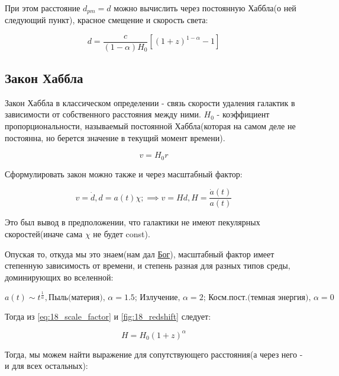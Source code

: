 При этом расстояние $d_{pm} = d$ можно вычислить через постоянную Хаббла(о ней следующий пункт), красное смещение и скорость света:

\begin{equation}
d = \frac{c}{(1-\alpha)H_0} [(1 + z)^{1-\alpha} - 1]
\label{eq:18_distance_h}
\end{equation}

\subsection{Закон Хаббла}

Закон Хаббла в классическом определении - связь скорости удаления галактик в зависимости от собственного расстояния между ними. $H_0$ - коэффициент пропорциональности, называемый постоянной Хаббла(которая на самом деле не постоянна, но берется значение в текущий момент времени).

\begin{equation}
v = H_0 r
\label{eq:18_classic_hubble}
\end{equation}

Сформулировать закон можно также и через масштабный фактор:

\begin{equation}
v = \dot{d}, d = a(t) \chi; \implies v = H d,  H = \frac{\dot{a}(t)}{a(t)}
\label{eq:18_hubble_law}
\end{equation}

Это был вывод в предположении, что галактики не имеют пекулярных скоростей(иначе сама $\chi$ не будет const).

Опуская то, откуда мы это знаем(нам дал \href{https://en.wikipedia.org/wiki/Friedmann_equations}{Бог}), масштабный фактор имеет степенную зависимость от времени, и степень разная для разных типов среды, доминирующих во вселенной:

\begin{equation}
a(t) \sim t^{\frac{1}{\alpha}}, \text{Пыль(материя), $\alpha=1.5$; Излучение, $\alpha=2$; Косм.пост.(темная энергия), $\alpha=0$}
\label{eq:18_scale_factor}
\end{equation}

Тогда из \ref{eq:18_scale_factor} и \ref{fig:18_redshift} следует:

\begin{equation}
H = H_0 (1 + z)^{\alpha}
\label{eq:18_hubble_z}
\end{equation}

Тогда, мы можем найти выражение для сопутствующего расстояния(а через него - и для всех остальных):

